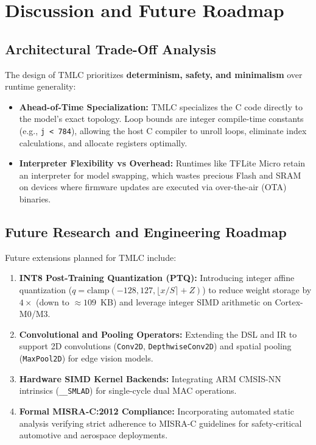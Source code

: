 \documentclass[11pt,a4paper]{article}
\begin{document}
\section{Discussion and Future Roadmap}
\label{sec:comparative_eval}

\subsection{Architectural Trade-Off Analysis}
The design of TMLC prioritizes \textbf{determinism, safety, and minimalism} over runtime generality:
\begin{itemize}[leftmargin=*]
    \item \textbf{Ahead-of-Time Specialization:} TMLC specializes the C code directly to the model's exact topology. Loop bounds are integer compile-time constants (e.g., \texttt{j < 784}), allowing the host C compiler to unroll loops, eliminate index calculations, and allocate registers optimally.
    \item \textbf{Interpreter Flexibility vs Overhead:} Runtimes like TFLite Micro retain an interpreter for model swapping, which wastes precious Flash and SRAM on devices where firmware updates are executed via over-the-air (OTA) binaries.
\end{itemize}

\subsection{Future Research and Engineering Roadmap}
Future extensions planned for TMLC include:
\begin{enumerate}
    \item \textbf{INT8 Post-Training Quantization (PTQ):} Introducing integer affine quantization ($q = \text{clamp}(-128, 127, \lfloor x/S \rceil + Z)$) to reduce weight storage by $4\times$ (down to $\approx 109$~KB) and leverage integer SIMD arithmetic on Cortex-M0/M3.
    \item \textbf{Convolutional and Pooling Operators:} Extending the DSL and IR to support 2D convolutions (\texttt{Conv2D}, \texttt{DepthwiseConv2D}) and spatial pooling (\texttt{MaxPool2D}) for edge vision models.
    \item \textbf{Hardware SIMD Kernel Backends:} Integrating ARM CMSIS-NN intrinsics (\texttt{\_\_SMLAD}) for single-cycle dual MAC operations.
    \item \textbf{Formal MISRA-C:2012 Compliance:} Incorporating automated static analysis verifying strict adherence to MISRA-C guidelines for safety-critical automotive and aerospace deployments.
\end{enumerate}
\end{document}
